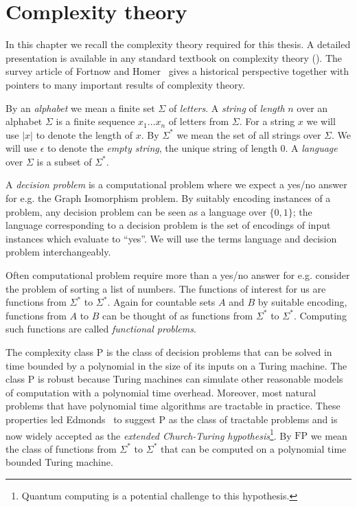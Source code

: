 \documentclass[11pt]{madras}%
\theoremstyle{remark}
\newcommand{\length}[1]{{\ensuremath{\left|#1\right|}}}
\begin{document}
\chapter{Complexity theory}
\label{chap-complexity-theory}

In this chapter we recall the complexity theory required for this
thesis. A detailed presentation is available in any standard textbook
on complexity theory (\cite{structcomp1,structcomp2}). The survey
article of Fortnow and Homer~\cite{fortnow2003history} gives a
historical perspective together with pointers to many important
results of complexity theory.

By an \emph{alphabet} we mean a finite set $\Sigma$ of \emph{letters}.
  A \emph{string} of
\emph{length} $n$ over an alphabet $\Sigma$
is a finite sequence $x_1\ldots x_n$ of letters from $\Sigma$. For a
string $x$ we will use $\length{x}$ to denote the length of $x$. By
$\Sigma^*$ we mean the set of all strings over $\Sigma$. We will use
$\epsilon$ to denote the \emph{empty string}, the
unique string of length $0$.  A \emph{language} over $\Sigma$ is a
subset of $\Sigma^*$.

A \emph{decision problem} is a computational
problem where we expect a yes/no answer for e.g. the Graph Isomorphism
problem. By suitably encoding instances of a problem, any decision
problem can be seen as a language over $\{0,1\}$; the language
corresponding to a decision problem is the set of encodings of input
instances which evaluate to ``yes''. We will use the terms language
and decision problem interchangeably.

Often computational problem require more than a yes/no answer for e.g.
consider the problem of sorting a list of numbers. The functions of
interest for us are functions from $\Sigma^*$ to $\Sigma^*$. Again for
countable sets $A$ and $B$ by suitable encoding, functions from $A$ to
$B$ can be thought of as functions from $\Sigma^*$ to $\Sigma^*$.
Computing such functions are called \emph{functional problems}.

The complexity class $\mathrm{P}$ is the class of decision problems
that can be solved in time bounded by a polynomial in the size of its
inputs on a Turing machine. The class $\mathrm{P}$ is robust because
Turing machines can simulate other reasonable models of computation
with a polynomial time overhead.  Moreover, most natural problems that
have polynomial time algorithms are tractable in practice.  These
properties led Edmonds~\cite{edmonds65paths} to suggest $\mathrm{P}$
as the class of tractable problems and is now widely accepted as the
\emph{extended Church-Turing hypothesis}\footnote{Quantum computing is
  a potential challenge to this hypothesis.}. By $\mathrm{FP}$ we mean
the class of functions from $\Sigma^*$ to $\Sigma^*$ that can be
computed on a polynomial time bounded Turing machine.
\end{document}
